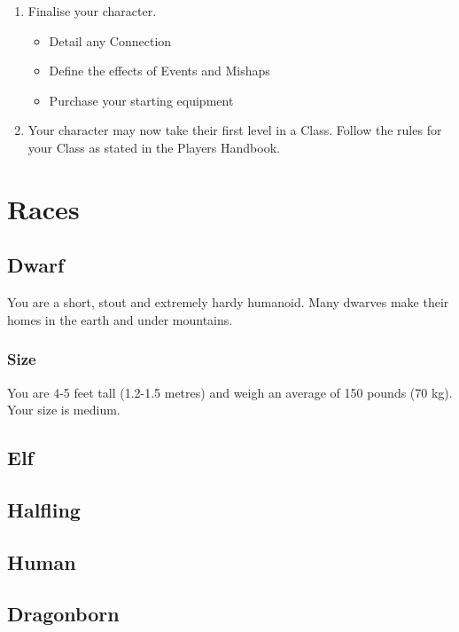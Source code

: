 \documentclass[10pt,twoside]{article}
\begin{document}
\begin{multicols}{2}
\begin{enumerate}
\begin{itemize}
\end{itemize}
\item Finalise your character.
\begin{itemize}
\item Detail any Connection
\item Define the effects of Events and Mishaps
\item Purchase your starting equipment
\end{itemize}
\item Your character may now take their first level in a Class. Follow the rules for your Class as stated in the Players Handbook.
\end{enumerate}

\columnbreak

\section{Races}

\subsection{Dwarf}

You are a short, stout and extremely hardy humanoid. Many dwarves make their homes in the earth and under mountains.

\subsubsection*{Size}
You are 4-5 feet tall (1.2-1.5 metres) and weigh an average of 150 pounds (70 kg). Your size is medium.


\subsection{Elf}


\subsection{Halfling}


\subsection{Human}


\subsection{Dragonborn}



\end{multicols}
\end{document}
